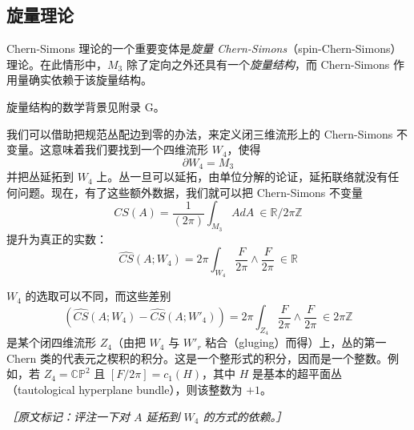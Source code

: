 \subsection{旋量理论} %

Chern-Simons 理论的一个重要变体是\emph{旋量 Chern-Simons}（spin-Chern-Simons）理论。在此情形中，$M_3$ 除了定向之外还具有一个\emph{旋量结构}，而 Chern-Simons 作用量确实依赖于该旋量结构。

旋量结构的数学背景见附录 G。

我们可以借助把规范丛配边到零的办法，来定义闭三维流形上的 Chern-Simons 不变量。这意味着我们要找到一个四维流形 $W_4$，使得
\begin{equation}
  \partial W_4=M_3
  \tag{2.346}
  \label{eq:2.346}
\end{equation}
并把丛延拓到 $W_4$ 上。丛一旦可以延拓，由单位分解的论证，延拓联络就没有任何问题。现在，有了这些额外数据，我们就可以把 Chern-Simons 不变量
\begin{equation}
  CS(A)=\frac{1}{(2\pi)}\int_{M_3}AdA\ \in\mathbb{R}/2\pi\mathbb{Z}
  \tag{2.347}
  \label{eq:2.347}
\end{equation}
提升为真正的实数：
\begin{equation}
  \widehat{CS}(A;W_4)=2\pi\int_{W_4}\frac{F}{2\pi}\wedge\frac{F}{2\pi}\ \in\mathbb{R}
  \tag{2.348}
  \label{eq:2.348}
\end{equation}

$W_4$ 的选取可以不同，而这些差别
\begin{equation}
  \left(\widehat{CS}(A;W_4)-\widehat{CS}(A;W'_4)\right)
  =2\pi\int_{Z_4}\frac{F}{2\pi}\wedge\frac{F}{2\pi}\ \in2\pi\mathbb{Z}
  \tag{2.349}
  \label{eq:2.349}
\end{equation}
是某个闭四维流形 $Z_4$（由把 $W_4$ 与 $W'_r$ 粘合（gluging）而得）上，丛的第一 Chern 类的代表元之楔积的积分。这是一个整形式的积分，因而是一个整数。例如，若 $Z_4=\mathbb{CP}^2$ 且 $[F/2\pi]=c_1(H)$，其中 $H$ 是基本的超平面丛（tautological hyperplane bundle），则该整数为 $+1$。

{\small\itshape ［原文标记：评注一下对 $A$ 延拓到 $W_4$ 的方式的依赖。］}


